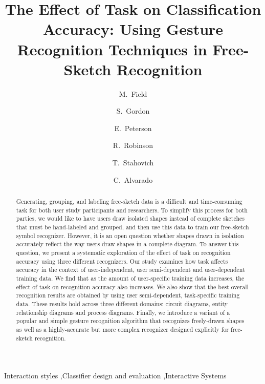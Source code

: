 \documentclass[final,5p,twocolumn]{elsarticle}
\begin{document}
\begin{frontmatter}
\title{The Effect of Task on Classification Accuracy: Using Gesture Recognition Techniques 
      in Free-Sketch Recognition}

\author[hmc]{M.~Field}

\author[hmc]{S.~Gordon}
\author[ucr]{E.~Peterson}
\author[hmc]{R.~Robinson}

\author[ucr]{T.~Stahovich}
\author[hmc]{C.~Alvarado}

\address[hmc]{Harvey Mudd College, Department of Computer Science, Claremont, California}
\address[ucr]{University of California: Riverside, Department of Mechanical Engineering, Riverside, 
California} 

\begin{abstract}
Generating, grouping, and labeling free-sketch data is a difficult and
time-consuming task for both user study participants and
researchers. To simplify this process for both parties, we would like
to have users draw isolated shapes instead of complete sketches that
must be hand-labeled and grouped, and then use this data to train our
free-sketch symbol recognizer.  However, it is an open question
whether shapes drawn in isolation accurately reflect the way users draw
shapes in a complete diagram.  To answer this question, 
we present a systematic exploration
of the effect of task on recognition accuracy using three different recognizers.
Our study examines how task affects accuracy in the context of 
user-independent, user semi-dependent
and user-dependent training data.   We find that as the amount of 
user-specific training data increases, the effect of task on recognition 
accuracy also increases.  We also show that the best overall recognition 
results are obtained by using user semi-dependent, task-specific training data.  
These results hold across three different domains: circuit diagrams, entity
relationship diagrams and process diagrams.  Finally,
we introduce a variant of a popular and simple gesture recognition
algorithm that recognizes freely-drawn shapes as well as a
highly-accurate but more complex recognizer designed explicitly for
free-sketch recognition.


\end{abstract}

\begin{keyword}
Interaction styles \sep Classifier design and evaluation \sep Interactive Systems
\end{keyword}

\end{frontmatter}
\end{document}
